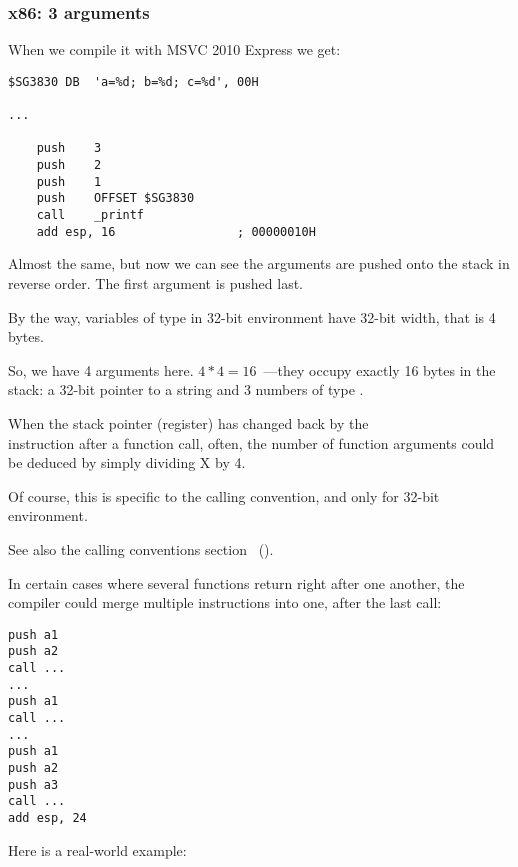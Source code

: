 \subsubsection{x86: 3 arguments}


When we compile it with MSVC 2010 Express we get:

\begin{lstlisting}
$SG3830	DB	'a=%d; b=%d; c=%d', 00H

...

	push	3
	push	2
	push	1
	push	OFFSET $SG3830
	call	_printf
	add	esp, 16					; 00000010H
\end{lstlisting}

Almost the same, but now we can see the \printf arguments are pushed onto the stack in reverse order. The first argument is pushed last.

By the way, variables of \Tint type in 32-bit environment have 32-bit width, that is 4 bytes.

So, we have 4 arguments here. $4*4 = 16$~---they occupy exactly 16 bytes in the stack: a 32-bit pointer to a string and 3 numbers of type \Tint.

When the \gls{stack pointer} (\ESP register) has changed back by the\\
 instruction after a function call, often,
the number of function arguments could be deduced by simply dividing X by 4.

Of course, this is specific to the  calling convention, and only for 32-bit environment.

See also the calling conventions section ~().

In certain cases where several functions return right after one another, the compiler could merge multiple  instructions into one, after the last call:

\begin{lstlisting}
push a1
push a2
call ...
...
push a1
call ...
...
push a1
push a2
push a3
call ...
add esp, 24
\end{lstlisting}

Here is a real-world example:



\clearpage
{}
\myindex{\olly}

